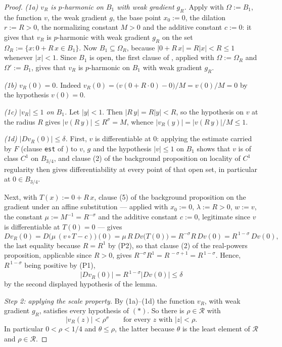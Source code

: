 \begin{proof}
\emph{(1a) $v_R$ is $p$-harmonic on $B_1$ with weak gradient $g_R$.}  Apply
 with $\Omega:=B_1$, the function $v$, the weak gradient $g$, the base
point $x_0:=0$, the dilation $r:=R>0$, the normalizing constant $M>0$ and the additive constant
$c:=0$: it gives that $v_R$ is $p$-harmonic with weak gradient $g_R$ on the set
$\Omega_R:=\{x:0+R\,x\in B_1\}$.  Now $B_1\subseteq\Omega_R$, because
$\lvert 0+R\,x\rvert=R\lvert x\rvert<R\le1$ whenever $\lvert x\rvert<1$.  Since $B_1$ is open,
the first clause of , applied with $\Omega:=\Omega_R$ and
$\Omega':=B_1$, gives that $v_R$ is $p$-harmonic on $B_1$ with weak gradient $g_R$.

\emph{(1b) $v_R(0)=0$.}  Indeed $v_R(0)=\bigl(v(0+R\cdot0)-0\bigr)/M=v(0)/M=0$ by the
hypothesis $v(0)=0$.

\emph{(1c) $\lvert v_R\rvert\le1$ on $B_1$.}  Let $\lvert y\rvert<1$.  Then
$\lvert R\,y\rvert=R\lvert y\rvert<R$, so the hypothesis on $v$ at the radius $R$ gives
$\lvert v(R\,y)\rvert\le R^{\sigma}=M$, whence
$\lvert v_R(y)\rvert=\lvert v(R\,y)\rvert/M\le1$.

\emph{(1d) $\lvert Dv_R(0)\rvert\le\delta$.}  First, $v$ is differentiable at $0$: applying the
estimate carried by $F$ (clause \texttt{est} of ) to $v$, $g$
and the hypothesis $\lvert v\rvert\le1$ on $B_1$ shows that $v$ is of class $C^{1}$ on
$B_{3/4}$, and clause (2) of the background proposition on locality of $C^{1}$ regularity then
gives differentiability at every point of that open set, in particular at $0\in B_{3/4}$.

Next, with $T(x):=0+R\,x$, clause (5) of the background proposition on the gradient under an
affine substitution --- applied with $x_0:=0$, $\lambda:=R>0$, $w:=v$, the constant
$\mu:=M^{-1}=R^{-\sigma}$ and the additive constant $c:=0$, legitimate since $v$ is
differentiable at $T(0)=0$ --- gives
\[
  Dv_R(0)=D\bigl(\mu\,(v\circ T-c)\bigr)(0)=\mu\,R\,Dv\bigl(T(0)\bigr)
  =R^{-\sigma}R\,Dv(0)=R^{\,1-\sigma}\,Dv(0),
\]
the last equality because $R=R^{1}$ by (P2), so that clause (2) of the real-powers
proposition, applicable since $R>0$, gives $R^{-\sigma}R^{1}=R^{\,-\sigma+1}=R^{\,1-\sigma}$.
Hence, $R^{\,1-\sigma}$ being positive by (P1),
\[
  \lvert Dv_R(0)\rvert=R^{\,1-\sigma}\lvert Dv(0)\rvert\le\delta
\]
by the second displayed hypothesis of the lemma.

\emph{Step 2: applying the scale property.}  By (1a)--(1d) the function $v_R$, with weak
gradient $g_R$, satisfies every hypothesis of $(\ast)$.  So there is
$\rho\in\mathcal{R}$ with
\begin{equation}\label{eq:isp-rho}
  \lvert v_R(z)\rvert<\rho^{\sigma}\qquad\text{for every }z\text{ with }\lvert z\rvert<\rho .
\end{equation}
In particular $0<\rho<1/4$ and $\theta\le\rho$, the latter because $\theta$ is the least element
of $\mathcal{R}$ and $\rho\in\mathcal{R}$.


\end{proof}
